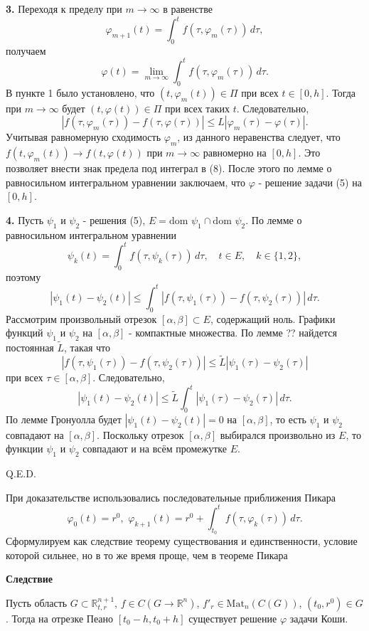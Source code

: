\textbf{3.} Переходя к пределу при $m \to \infty$ в равенстве
$$\varphi_{m+1}(t) = \int_{0}^{t} f(\tau, \varphi_m(\tau)) \, d\tau,$$
получаем
$$\varphi(t) = \lim_{m \to \infty} \int_{0}^{t} f(\tau, \varphi_m(\tau)) \, d\tau.$$
В пункте 1 было установлено, что $(t, \varphi_m(t)) \in \Pi$ при всех $t \in [0, h]$. Тогда при $m \to \infty$ будет $(t, \varphi(t)) \in \Pi$ при всех таких $t$. Следовательно,
$$|f(\tau, \varphi_m(\tau)) - f(\tau, \varphi(\tau))| \leq L |\varphi_m(\tau) - \varphi(\tau)|.$$
Учитывая равномерную сходимость $\varphi_m$, из данного неравенства следует, что $f(t, \varphi_m(t)) \to f(t, \varphi(t))$ при $m \to \infty$ равномерно на $[0, h]$. Это позволяет внести знак предела под интеграл в (8). После этого по лемме о равносильном интегральном уравнении заключаем, что $\varphi$ - решение задачи (5) на $[0, h]$.

\textbf{4.} Пусть $\psi_1$ и $\psi_2$ - решения (5), $E = \text{dom } \psi_1 \cap \text{dom } \psi_2$. По лемме о равносильном интегральном уравнении
$$\psi_k(t) = \int_{0}^{t} f(\tau, \psi_k(\tau)) \, d\tau, \quad t \in E, \quad k \in \{1, 2\},$$
поэтому
$$|\psi_1(t) - \psi_2(t)| \leq \int_{0}^{t} |f(\tau, \psi_1(\tau)) - f(\tau, \psi_2(\tau))| \, d\tau.$$
Рассмотрим произвольный отрезок $[\alpha, \beta] \subset E$, содержащий ноль. Графики функций $\psi_1$ и $\psi_2$ на $[\alpha, \beta]$ - компактные множества. По лемме ?? найдется постоянная $\tilde{L}$, такая что
$$|f(\tau, \psi_1(\tau)) - f(\tau, \psi_2(\tau))| \leq \tilde{L} |\psi_1(\tau) - \psi_2(\tau)|$$
при всех $\tau \in [\alpha, \beta]$. Следовательно,
$$|\psi_1(t) - \psi_2(t)| \leq \tilde{L} \int_{0}^{t} |\psi_1(\tau) - \psi_2(\tau)| \, d\tau.$$
По лемме Гронуолла будет $|\psi_1(t) - \psi_2(t)| = 0$ на $[\alpha, \beta]$, то есть $\psi_1$ и $\psi_2$ совпадают на $[\alpha, \beta]$. Поскольку отрезок $[\alpha, \beta]$ выбирался произвольно из $E$, то функции $\psi_1$ и $\psi_2$ совпадают и на всём промежутке $E$.

\hfill Q.E.D.

 При доказательстве использовались последовательные приближения Пикара
$$\varphi_0(t) = r^0, \, \,
\varphi_{k+1}(t) = r^0 + \int_{t_0}^{t} f(\tau, \varphi_k(\tau)) \, d\tau.$$
Сформулируем как следствие теорему существования и единственности, условие которой сильнее, но в то же время проще, чем в теореме Пикара

\textbf{Следствие} 

Пусть область $G \subset \mathbb{R}_{t,r}^{n+1}$, $f \in C(G \to \mathbb{R}^n)$, $f'_r \in \text{Mat}_n(C(G))$, $(t_0, r^0) \in G$. Тогда на отрезке Пеано $[t_0 - h, t_0 + h]$ существует решение $\varphi$ задачи Коши.

